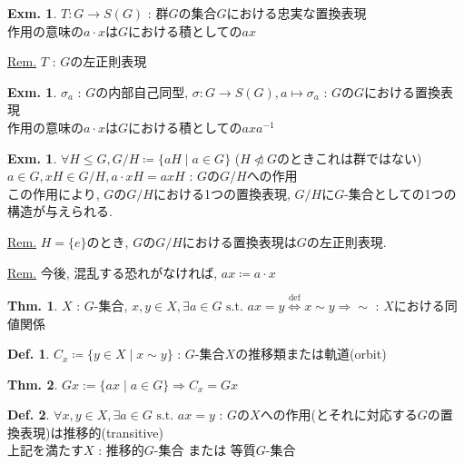 \documentclass[uplatex,dvipdfmx,9pt]{beamer}
\newcommand{\defarrow}{\overset{\mathrm{def}}{\Leftrightarrow}}
\newcommand{\notnsubgroup}{\ntriangleleft} %
\newcommand{\inverse}[1]{#1^{-1}}
\newcommand{\st}{\text{ s.t. }}
\newcounter{textExmCount}
\theoremstyle{definition} %
\newtheorem{defn}{Def.}[subsection] %
\newtheorem{thm}{Thm.}[subsection] %
\theoremstyle{example}
\newtheorem{exmText}[textExmCount]{Exm.}
\begin{document}
      \begin{frame}

        \begin{exmText}
          $T \colon G \to S(G)$ : 群$G$の集合$G$における忠実な置換表現 \\
          作用の意味の$a \cdot x$は$G$における積としての$ax$
        \end{exmText}

        \underline{Rem.} $T$ : $G$の\alert{左正則表現}

        \begin{exmText}
          $\sigma_a$ : $G$の内部自己同型, $\sigma \colon G \to S(G), a \mapsto \sigma_a$ : $G$の$G$における置換表現 \\
          作用の意味の$a \cdot x$は$G$における積としての$ax\inverse{a}$
        \end{exmText}

        \begin{exmText}
          $\forall H \le G, G/H \coloneqq \{ aH \mid a \in G\}$ ($H \notnsubgroup G$のときこれは群ではない) \\
          $a \in G, xH \in G/H, a \cdot xH = axH$ : $G$の$G/H$への作用 \\
          この作用により, $G$の$G/H$における1つの置換表現, $G/H$に$G$-集合としての1つの構造が与えられる.
        \end{exmText}
        \underline{Rem.} $H = \{e\}$のとき, $G$の$G/H$における置換表現は$G$の左正則表現.
        
      \end{frame}

      \begin{frame}

        \underline{Rem.} 今後, 混乱する恐れがなければ, $ax \coloneqq a \cdot x$

        \begin{thm}
          $X$ : $G$-集合, $x, y \in X, \exists a \in G \st ax = y \defarrow x \sim y \Rightarrow \sim$ : $X$における同値関係
        \end{thm}

        \begin{defn}
          $C_x \coloneqq \{ y \in X \mid x \sim y \}$ : $G$-集合$X$の\alert{推移類}または\alert{軌道(orbit)}
        \end{defn}

        \begin{thm}
          $Gx := \{ ax \mid a \in G\} \Rightarrow C_x = Gx$
        \end{thm}

        \begin{defn}
          $\forall x, y \in X, \exists a \in G \st ax = y$ : $G$の$X$への作用(とそれに対応する$G$の置換表現)は\alert{推移的(transitive)} \\
          上記を満たす$X$ : \alert{推移的}$G$-集合 または \alert{等質}$G$-集合
        \end{defn}
        
      \end{frame}
\end{document}
